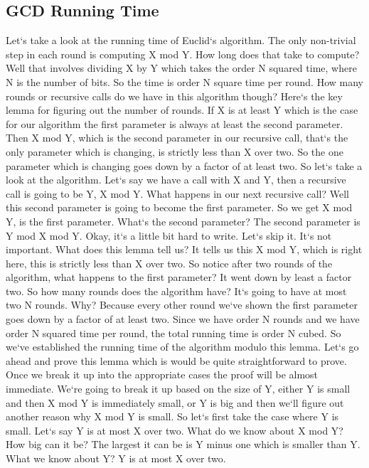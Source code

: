 \subsection{GCD  Running Time}
Let`s take a look at the running time of Euclid`s algorithm.
The only non-trivial step in each round is computing X mod Y\@.
How long does that take to compute? Well that involves dividing X by Y which takes the order N squared time, where N is the number of bits.
So the time is order N square time per round.
How many rounds or recursive calls do we have in this algorithm though? Here`s the key lemma for figuring out the number of rounds.
If X is at least Y which is the case for our algorithm the first parameter is always at least the second parameter.
Then X mod Y, which is the second parameter in our recursive call, that`s the only parameter which is changing, is strictly less than X over two.
So the one parameter which is changing goes down by a factor of at least two.
So let`s take a look at the algorithm.
Let`s say we have a call with X and Y, then a recursive call is going to be Y, X mod Y\@.
What happens in our next recursive call? Well this second parameter is going to become the first parameter.
So we get X mod Y, is the first parameter.
What`s the second parameter? The second parameter is Y mod X mod Y\@.
Okay, it`s a little bit hard to write.
Let`s skip it.
It`s not important.
What does this lemma tell us? It tells us this X mod Y, which is right here, this is strictly less than X over two.
So notice after two rounds of the algorithm, what happens to the first parameter? It went down by least a factor two.
So how many rounds does the algorithm have? It`s going to have at most two N rounds.
Why? Because every other round we`ve shown the first parameter goes down by a factor of at least two.
Since we have order N rounds and we have order N squared time per round, the total running time is order N cubed.
So we`ve established the running time of the algorithm modulo this lemma.
Let`s go ahead and prove this lemma which is would be quite straightforward to prove.
Once we break it up into the appropriate cases the proof will be almost immediate.
We`re going to break it up based on the size of Y, either Y is small and then X mod Y is immediately small, or Y is big and then we`ll figure out another reason why X mod Y is small.
So let`s first take the case where Y is small.
Let`s say Y is at most X over two.
What do we know about X mod Y? How big can it be? The largest it can be is Y minus one which is smaller than Y\@.
What we know about Y? Y is at most X over two.

